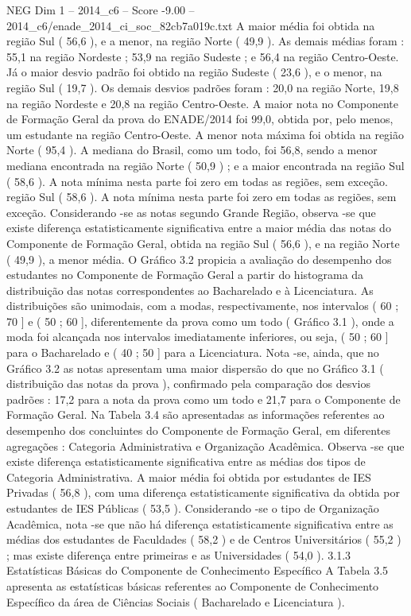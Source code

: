 \begin{textsample}{NEG Dim 1 – 2014\_c6 – Score -9.00 – 2014\_c6/enade\_2014\_ci\_soc\_82cb7a019c.txt}
A maior média foi obtida na região Sul ( 56,6 ), e a menor, na região Norte ( 49,9 ).
As demais médias foram : 55,1 na região Nordeste ; 53,9 na região Sudeste ; e 56,4 na região Centro-Oeste.
Já o maior desvio padrão foi obtido na região Sudeste ( 23,6 ), e o menor, na região Sul ( 19,7 ).
Os demais desvios padrões foram : 20,0 na região Norte, 19,8 na região Nordeste e 20,8 na região Centro-Oeste.
A maior nota no Componente de Formação Geral da prova do ENADE/2014 foi 99,0, obtida por, pelo menos, um estudante na região Centro-Oeste.
A menor nota máxima foi obtida na região Norte ( 95,4 ).
A mediana do Brasil, como um todo, foi 56,8, sendo a menor mediana encontrada na região Norte ( 50,9 ) ; e a maior encontrada na região Sul ( 58,6 ).
A nota mínima nesta parte foi zero em todas as regiões, sem exceção. região Sul ( 58,6 ).
A nota mínima nesta parte foi zero em todas as regiões, sem exceção.
Considerando -se as notas segundo Grande Região, observa -se que existe diferença estatisticamente significativa entre a maior média das notas do Componente de Formação Geral, obtida na região Sul ( 56,6 ), e na região Norte ( 49,9 ), a menor média.
O Gráfico 3.2 propicia a avaliação do desempenho dos estudantes no Componente de Formação Geral a partir do histograma da distribuição das notas correspondentes ao Bacharelado e à Licenciatura.
As distribuições são unimodais, com a modas, respectivamente, nos intervalos ( 60 ; 70 ] e ( 50 ; 60 ], diferentemente da prova como um todo ( Gráfico 3.1 ), onde a moda foi alcançada nos intervalos imediatamente inferiores, ou seja, ( 50 ; 60 ] para o Bacharelado e ( 40 ; 50 ] para a Licenciatura.
Nota -se, ainda, que no Gráfico 3.2 as notas apresentam uma maior dispersão do que no Gráfico 3.1 ( distribuição das notas da prova ), confirmado pela comparação dos desvios padrões : 17,2 para a nota da prova como um todo e 21,7 para o Componente de Formação Geral.
Na Tabela 3.4 são apresentadas as informações referentes ao desempenho dos concluintes do Componente de Formação Geral, em diferentes agregações : Categoria Administrativa e Organização Acadêmica.
Observa -se que existe diferença estatisticamente significativa entre as médias dos tipos de Categoria Administrativa.
A maior média foi obtida por estudantes de IES Privadas ( 56,8 ), com uma diferença estatisticamente significativa da obtida por estudantes de IES Públicas ( 53,5 ).
Considerando -se o tipo de Organização Acadêmica, nota -se que não há diferença estatisticamente significativa entre as médias dos estudantes de Faculdades ( 58,2 ) e de Centros Universitários ( 55,2 ) ; mas existe diferença entre primeiras e as Universidades ( 54,0 ). 3.1.3 Estatísticas Básicas do Componente de Conhecimento Específico A Tabela 3.5 apresenta as estatísticas básicas referentes ao Componente de Conhecimento Específico da área de Ciências Sociais ( Bacharelado e Licenciatura ).

\end{textsample}
